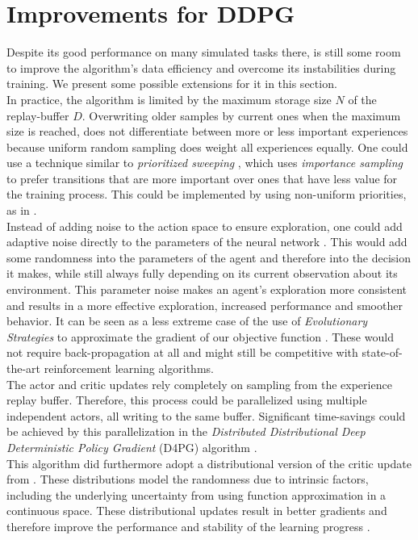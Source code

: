 \section{Improvements for DDPG}
\label{sec:improvements}
Despite its good performance on many simulated tasks there, is still some room to improve the algorithm's data efficiency and overcome its instabilities during training. We present some possible extensions for it in this section.\\
In practice, the algorithm is limited by the maximum storage size $\mathit{N}$ of the replay-buffer $\mathit{D}$. Overwriting older samples by current ones when the maximum size is reached, does not differentiate between more or less important experiences because uniform random sampling does weight all experiences equally. One could use a technique similar to \textit{prioritized sweeping} \citep{moore1993prioritized}, which uses \textit{importance sampling} \citep{glynn1989importance} to prefer transitions that are more important over ones that have less value for the training process. This could be implemented by using non-uniform priorities, as in \citep{schaul2015prioritized,barth2018distributed}.\\
Instead of adding noise to the action space to ensure exploration, one could add adaptive noise directly to the parameters of the neural network \citep{plappert2017parameter}. This would add some randomness into the parameters of the agent and therefore into the decision it makes, while still always fully depending on its current observation about its environment. This parameter noise makes an agent's exploration more consistent and results in a more effective exploration, increased performance and smoother behavior. 
It can be seen as a less extreme case of the use of \textit{Evolutionary Strategies} to approximate the gradient of our objective function \citep{salimans2017evolution}. These would not require back-propagation at all and might still be competitive with state-of-the-art reinforcement learning algorithms.\\
The actor and critic updates rely completely on sampling from the experience replay buffer. Therefore, this process could be parallelized using multiple independent actors, all writing to the same buffer. Significant time-savings could be achieved by this parallelization in the \textit{Distributed Distributional Deep Deterministic Policy Gradient} (D4PG) algorithm  \citep{barth2018distributed}.\\
This algorithm did furthermore adopt a distributional version of the critic update from \citep{bellemare2017distributional}. These distributions model the randomness due to intrinsic factors, including the underlying uncertainty from using function approximation in a continuous space. These distributional updates result in better gradients and therefore improve the performance and stability of the learning progress \citep{barth2018distributed}.\\
